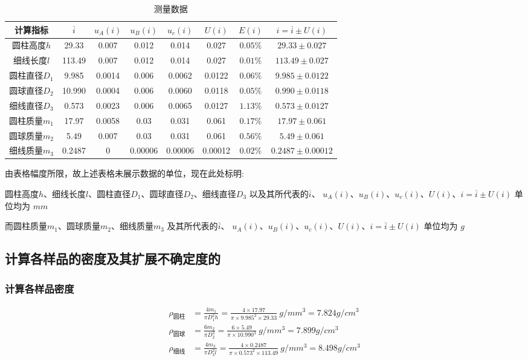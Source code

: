\documentclass[UTF8]{ctexart}
\begin{document}
\begin{table}[H]
\centering
\caption*{测量数据}
\begin{tabular}{c|c|c|c|c|c|c|c}
\toprule[1pt]
\midrule
     计算指标 & $\overline{i}$ & $u_A(i)$ & $u_B(i)$ & $u_{c}(i)$ & $U(i)$ & $E(i)$  & $i=\overline{i} \pm U(i)$ \\
\midrule
      圆柱高度$h$&29.33  & 0.007 & 0.012 & 0.014 & 0.027 & $0.05\%$ &  $29.33 \pm 0.027$  \\
\midrule
细线长度$l$& 113.49 & 0.007 & 0.012 & 0.014& 0.027 & $0.01\%$&  $113.49 \pm 0.027$   \\
\midrule
圆柱直径$D_1$&9.985  & 0.0014 & 0.006 &0.0062 & 0.0122 & $0.06\%$ &  $9.985 \pm 0.0122$   \\
\midrule
圆球直径$D_2$& 10.990 & 0.0004 & 0.006 & 0.0060& 0.0118 & $0.05\%$ &  $0.990 \pm 0.0118$   \\
\midrule
细线直径$D_3$& 0.573 & 0.0023 & 0.006& 0.0065 & 0.0127 &$1.13\%$  &  $0.573 \pm 0.0127$   \\
\midrule
圆柱质量$m_1$& 17.97 & 0.0058 & 0.03 & 0.031 & 0.061 & $0.17\%$  & $17.97 \pm 0.061$ \\
\midrule
圆球质量$m_2$&5.49  & 0.007 & 0.03 & 0.031 & 0.061 & $0.56\%$ &  $5.49 \pm 0.061$   \\
\midrule
细线质量$m_3$& 0.2487 & 0 & 0.00006 & 0.00006 & 0.00012 &  $0.02\%$ & $0.2487 \pm 0.00012$ \\
\midrule
\bottomrule[1pt]
\end{tabular}
\end{table}


\begin{spacing}{1.2}
由表格幅度所限，故上述表格未展示数据的单位，现在此处标明:

圆柱高度$h$、细线长度$l$、圆柱直径$D_1$、圆球直径$D_2$、细线直径$D_3$ 以及其所代表的$\overline{i}$、 $u_A(i)$、$u_B(i)$、$u_{c}(i)$、$U(i)$、$i=\overline{i} \pm U(i)$ 单位均为 $mm$

而圆柱质量$m_1$、圆球质量$m_2$、细线质量$m_3$ 及其所代表的$\overline{i}$、 $u_A(i)$、$u_B(i)$、$u_{c}(i)$、$U(i)$、$i=\overline{i} \pm U(i)$ 单位均为 $g$
\end{spacing}






\subsection{计算各样品的密度及其扩展不确定度的}
\subsubsection{计算各样品密度}
\begin{align*}
    \rho_{\text{圆柱}} &= \frac{4m_1}{\pi D_1^2 h} = \frac{4 \times 17.97}{ \pi \times 9.985^2 \times 29.33} \ g/mm^3 =  7.824 g/cm^3\\
    \rho_{\text{圆球}} &= \frac{6m_2}{\pi D_2^3} = \frac{6 \times 5.49 }{\pi \times 10.990^3 } \ g/mm^3= 7.899 g/cm^3\\
    \rho_{\text{细线}} &= \frac{4m_3}{\pi D_3^2l} = \frac{4 \times 0.2487 }{\pi \times 0.573^2 \times 113.49 } \ g/mm^3 =8.498g/cm^3
\end{align*}
\end{document}
